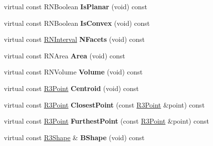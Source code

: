 \begin{DoxyCompactItemize}
\item 
virtual const R\+N\+Boolean {\bfseries Is\+Planar} (void) const \hypertarget{class_r3_box_ae362c70e0dd7c11711b690a5b183a2f1}{}\label{class_r3_box_ae362c70e0dd7c11711b690a5b183a2f1}

\item 
virtual const R\+N\+Boolean {\bfseries Is\+Convex} (void) const \hypertarget{class_r3_box_a754c9694b07831b50faed2a003caed2f}{}\label{class_r3_box_a754c9694b07831b50faed2a003caed2f}

\item 
virtual const \hyperlink{class_r_n_interval}{R\+N\+Interval} {\bfseries N\+Facets} (void) const \hypertarget{class_r3_box_ae405e2bd926c5c1b2acd638c2d65db46}{}\label{class_r3_box_ae405e2bd926c5c1b2acd638c2d65db46}

\item 
virtual const R\+N\+Area {\bfseries Area} (void) const \hypertarget{class_r3_box_a3c1a48dfbb4877b936b43e8094a50266}{}\label{class_r3_box_a3c1a48dfbb4877b936b43e8094a50266}

\item 
virtual const R\+N\+Volume {\bfseries Volume} (void) const \hypertarget{class_r3_box_a22730c07ecb4f82db36f78de4bb9e36b}{}\label{class_r3_box_a22730c07ecb4f82db36f78de4bb9e36b}

\item 
virtual const \hyperlink{class_r3_point}{R3\+Point} {\bfseries Centroid} (void) const \hypertarget{class_r3_box_a7bd768acbb097d1e8d931dff8cbc1d0c}{}\label{class_r3_box_a7bd768acbb097d1e8d931dff8cbc1d0c}

\item 
virtual const \hyperlink{class_r3_point}{R3\+Point} {\bfseries Closest\+Point} (const \hyperlink{class_r3_point}{R3\+Point} \&point) const \hypertarget{class_r3_box_a53203cbdf800dfa96a30e9a576e576f3}{}\label{class_r3_box_a53203cbdf800dfa96a30e9a576e576f3}

\item 
virtual const \hyperlink{class_r3_point}{R3\+Point} {\bfseries Furthest\+Point} (const \hyperlink{class_r3_point}{R3\+Point} \&point) const \hypertarget{class_r3_box_ac67bc6b8e570d794de61ffc77aec190e}{}\label{class_r3_box_ac67bc6b8e570d794de61ffc77aec190e}

\item 
virtual const \hyperlink{class_r3_shape}{R3\+Shape} \& {\bfseries B\+Shape} (void) const \hypertarget{class_r3_box_adec5d24b08a8b0dd7e5ba34588229d4f}{}\label{class_r3_box_adec5d24b08a8b0dd7e5ba34588229d4f}


\end{DoxyCompactItemize}
